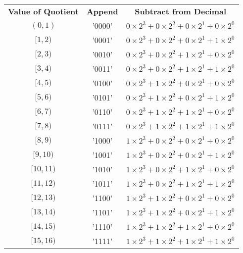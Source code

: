 \documentclass[12pt]{article}
\begin{document}
\begin{center}
\begin{tabular}{c|c|c}
    \textbf{Value of Quotient} & \textbf{Append} & \textbf{Subtract from Decimal} \\
    $(0,1)$   & '0000' & $0\times2^3 + 0\times2^2 + 0\times2^1 + 0\times2^0$ \\
    $[1,2)$   & '0001' & $0\times2^3 + 0\times2^2 + 0\times2^1 + 1\times2^0$ \\
    $[2,3)$   & '0010' & $0\times2^3 + 0\times2^2 + 1\times2^1 + 0\times2^0$ \\
    $[3,4)$   & '0011' & $0\times2^3 + 0\times2^2 + 1\times2^1 + 1\times2^0$ \\
    $[4,5)$   & '0100' & $0\times2^3 + 1\times2^2 + 0\times2^1 + 0\times2^0$ \\
    $[5,6)$   & '0101' & $0\times2^3 + 1\times2^2 + 0\times2^1 + 1\times2^0$ \\
    $[6,7)$   & '0110' & $0\times2^3 + 1\times2^2 + 1\times2^1 + 0\times2^0$ \\
    $[7,8)$   & '0111' & $0\times2^3 + 1\times2^2 + 1\times2^1 + 1\times2^0$ \\
    $[8,9)$   & '1000' & $1\times2^3 + 0\times2^2 + 0\times2^1 + 0\times2^0$ \\
    $[9,10)$  & '1001' & $1\times2^3 + 0\times2^2 + 0\times2^1 + 1\times2^0$ \\
    $[10,11)$ & '1010' & $1\times2^3 + 0\times2^2 + 1\times2^1 + 0\times2^0$ \\
    $[11,12)$ & '1011' & $1\times2^3 + 0\times2^2 + 1\times2^1 + 1\times2^0$ \\
    $[12,13)$ & '1100' & $1\times2^3 + 1\times2^2 + 0\times2^1 + 0\times2^0$ \\
    $[13,14)$ & '1101' & $1\times2^3 + 1\times2^2 + 0\times2^1 + 1\times2^0$ \\
    $[14,15)$ & '1110' & $1\times2^3 + 1\times2^2 + 1\times2^1 + 0\times2^0$ \\
    $[15,16)$ & '1111' & $1\times2^3 + 1\times2^2 + 1\times2^1 + 1\times2^0$
\end{tabular}
\end{center}
\end{document}
